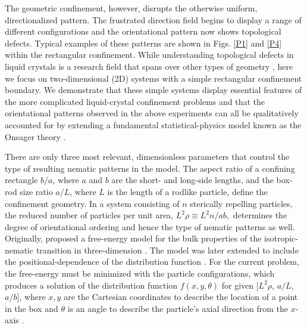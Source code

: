 \documentclass[prl,twocolumn,preprintnumbers,reprint]{revtex4}
\begin{document}
The geometric confinement, however, disrupts the otherwise uniform, directionalized pattern. The frustrated direction field begins to display a range of different configurations and the orientational pattern now shows topological defects. Typical examples of these patterns are shown in Figs. \ref{P1} and \ref{P4} within the rectangular confinement. While understanding topological defects in liquid crystals is a research field that spans over other types of geometry  \cite{deG1993, trebin1982topology, kleman1989defects, Kleman2006, Alexander2012}, here we focus on two-dimensional (2D) systems with a simple rectangular confinement boundary. We demonstrate that these simple systems display essential features of the more complicated liquid-crystal confinement problems and that the orientational patterns observed in the above experiments can all be qualitatively accounted for by extending a fundamental statistical-physics model known as the Onsager theory \cite{Onsager1949}. %

There are only three most relevant, dimensionless parameters that control the type of resulting nematic patterns in the model. The aspect ratio of a confining rectangle $b/a$, where $a$ and $b$ are the short- and long-side lengths,
and the box-rod size ratio  $a/L$, where $L$ is the length of a rodlike particle, define the confinement geometry.
In a system consisting of $n$ sterically repelling particles, the reduced number of particles per unit area,
$
L^2 \rho \equiv L^2 n/ab,
$ determines the degree of orientational ordering and hence the type of nematic patterns as well.
Originally, \citeauthor{Onsager1949} proposed a free-energy model for the bulk properties of the isotropic-nematic transition in three-dimension \cite{Onsager1949}. The model was later extended to include the positional-dependence of the distribution function \cite{McMullen88,Holyst88,McMullen1990,Chen1992,Chen1993,Koch1999,Roij01}. For the current problem, the free-energy must be minimized with the particle configurations, which produces a solution of the distribution function ${f}({x,y,\theta})$ for given $[L^2 \rho$, $a/L$, $a/b]$, where $x, y$ are the Cartesian coordinates to describe the location of a point in the box and $\theta$ is an angle to describe the particle's axial direction from the $x$-axis \cite{Chen2013}.
\end{document}
